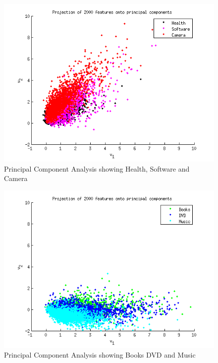 \begin{figure}[H]
\centering
\includegraphics[scale = 1]{../Plottar/pca_largecorr.png}
\caption{Principal Component Analysis showing Health, Software and Camera}
\end{figure} 

\begin{figure}[H]
\centering
\includegraphics[scale = 1]{../Plottar/pca_somecorr.png}
\caption{Principal Component Analysis showing Books DVD and Music}
\end{figure} 

